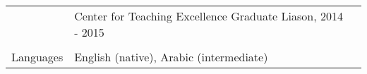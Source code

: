 \documentclass[letterpaper,11pt,oneside]{article}
\begin{document}
\begin{tabular}{@{} l l l}
&Center for Teaching Excellence Graduate Liason, 2014 - 2015\\
\\
    
% 

 
 \Large{Languages}   & English (native), Arabic (intermediate) \\
\end{tabular}
%
%
%
\end{document}

